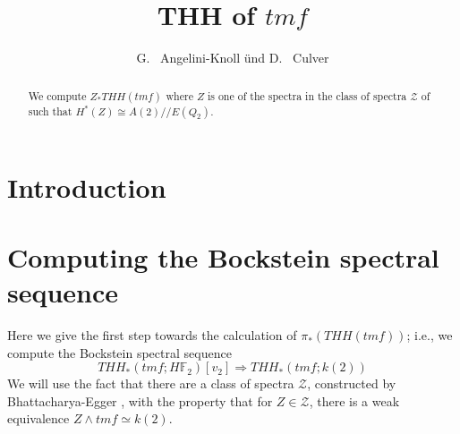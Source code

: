 \documentclass[12pt]{amsart}
\title{THH of $tmf$}
\author{ G.~ Angelini-Knoll \"und D.~ Culver}\address{University of Illinois, Urbana-Champaign}\email{dculver@nd.edu}\address{Michigan State University, East Lansing}\email{angelini@math.msu.edu}
\theoremstyle{definition}
\numberwithin{equation}{section}
\numberwithin{figure}{section}
\begin{document}
\maketitle

\begin{abstract}
We compute $Z_*THH(tmf)$ where $Z$ is one of the spectra in the class of spectra $\mathcal{Z}$ of \cite{BE16} such that $H^*(Z)\cong A(2)//E(Q_2)$. 
\end{abstract}

\tableofcontents
\section{Introduction}

\section{Computing the Bockstein spectral sequence}
Here we give the first step towards the calculation of $\pi_*(THH(tmf))$; i.e., we compute the Bockstein spectral sequence 
\begin{equation}\label{bock ss}THH_*(tmf;H\mathbb{F}_2)[v_2]\Rightarrow THH_*(tmf;k(2))\end{equation}
We will use the fact that there are a class of spectra $\mathcal{Z}$, constructed by Bhattacharya-Egger \cite{BE16}, with the property that for $Z\in \mathcal{Z}$, there is a weak equivalence $Z\wedge tmf\simeq k(2)$. 
\end{document}
